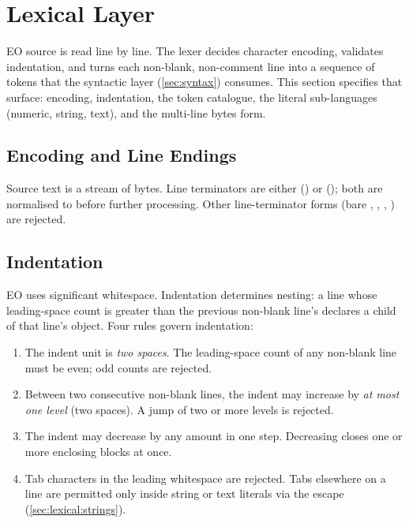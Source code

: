 
\section{Lexical Layer}\label{sec:lexical}

EO source is read line by line.
The lexer decides character encoding, validates indentation,
  and turns each non-blank, non-comment line
  into a sequence of tokens that the syntactic layer (\cref{sec:syntax}) consumes.
This section specifies that surface: encoding, indentation, the token catalogue,
  the literal sub-languages (numeric, string, text), and the multi-line bytes form.

\subsection{Encoding and Line Endings}\label{sec:lexical:encoding}

Source text is a stream of  bytes.
Line terminators are either  () or
   ();
  both are normalised to  before further processing.
Other line-terminator forms (bare , , , ) are rejected.

\subsection{Indentation}\label{sec:lexical:indent}

EO uses significant whitespace.
Indentation determines nesting:
  a line whose leading-space count is greater than the previous non-blank line's
  declares a child of that line's object.
Four rules govern indentation:

\begin{enumerate}
  \item The indent unit is \emph{two spaces}.
    The leading-space count of any non-blank line must be even;
    odd counts are rejected.
  \item Between two consecutive non-blank lines, the indent may increase
    by \emph{at most one level} (two spaces).
    A jump of two or more levels is rejected.
  \item The indent may decrease by any amount in one step.
    Decreasing closes one or more enclosing blocks at once.
  \item Tab characters in the leading whitespace are rejected.
    Tabs elsewhere on a line are permitted only inside string or text literals
    via the  escape (\cref{sec:lexical:strings}).
\end{enumerate}

